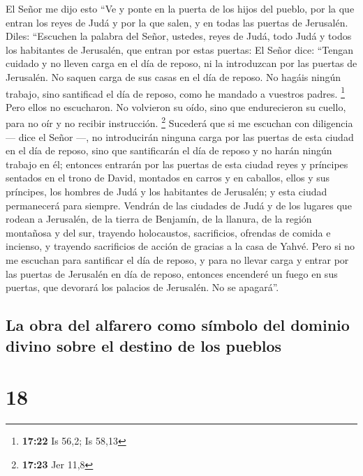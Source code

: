 El Señor me dijo esto ``Ve y ponte en la puerta de los
hijos del pueblo, por la que entran los reyes de Judá y por la que
salen, y en todas las puertas de Jerusalén.  Diles:
``Escuchen la palabra del Señor, ustedes, reyes de Judá, todo Judá y
todos los habitantes de Jerusalén, que entran por estas puertas:
 El Señor dice: ``Tengan cuidado y no lleven carga en el
día de reposo, ni la introduzcan por las puertas de Jerusalén.
 No saquen carga de sus casas en el día de reposo. No
hagáis ningún trabajo, sino santificad el día de reposo, como he mandado
a vuestros padres. \footnote{\textbf{17:22} Is 56,2; Is 58,13}
 Pero ellos no escucharon. No volvieron su oído, sino que
endurecieron su cuello, para no oír y no recibir instrucción.
\footnote{\textbf{17:23} Jer 11,8}  Sucederá que si me
escuchan con diligencia --- dice el Señor ---, no introducirán ninguna
carga por las puertas de esta ciudad en el día de reposo, sino que
santificarán el día de reposo y no harán ningún trabajo en él;
 entonces entrarán por las puertas de esta ciudad reyes y
príncipes sentados en el trono de David, montados en carros y en
caballos, ellos y sus príncipes, los hombres de Judá y los habitantes de
Jerusalén; y esta ciudad permanecerá para siempre. 
Vendrán de las ciudades de Judá y de los lugares que rodean a Jerusalén,
de la tierra de Benjamín, de la llanura, de la región montañosa y del
sur, trayendo holocaustos, sacrificios, ofrendas de comida e incienso, y
trayendo sacrificios de acción de gracias a la casa de Yahvé.
 Pero si no me escuchan para santificar el día de reposo,
y para no llevar carga y entrar por las puertas de Jerusalén en día de
reposo, entonces encenderé un fuego en sus puertas, que devorará los
palacios de Jerusalén. No se apagará''.

\hypertarget{la-obra-del-alfarero-como-suxedmbolo-del-dominio-divino-sobre-el-destino-de-los-pueblos}{%
\subsection{La obra del alfarero como símbolo del dominio divino sobre
el destino de los
pueblos}\label{la-obra-del-alfarero-como-suxedmbolo-del-dominio-divino-sobre-el-destino-de-los-pueblos}}

\hypertarget{section-17}{%
\section{18}\label{section-17}}

